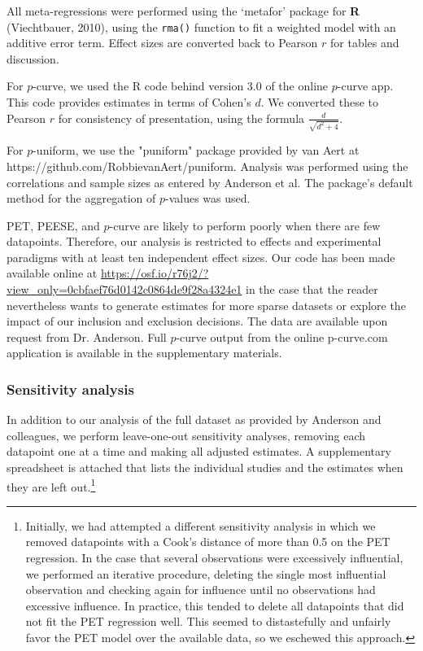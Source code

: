 \documentclass[man, mask]{apa6}
\begin{document}
All meta-regressions were performed using the `metafor' package for {\bf R} (Viechtbauer, 2010), using the {\tt rma()} function to fit a weighted model with an additive error term. Effect sizes are converted back to Pearson $r$ for tables and discussion. 
\nocite{Viechtbauer:2010} 

For $p$-curve, we used the R code behind version 3.0 of the online $p$-curve app. This code provides estimates in terms of Cohen's $d$. We converted these to Pearson $r$ for consistency of presentation, using the formula $\frac{d}{\sqrt{d^2+4}}$.

For $p$-uniform, we use the "puniform" package provided by van Aert at https://github.com/RobbievanAert/puniform. Analysis was performed using the correlations and sample sizes as entered by Anderson et al. The package's default method for the aggregation of $p$-values was used.


PET, PEESE, and $p$-curve are likely to perform poorly when there are few datapoints. Therefore, our analysis is restricted to effects and experimental paradigms with at least ten independent effect sizes. %
Our code has been made available online at \url{https://osf.io/r76j2/?view\_only=0cbfaef76d0142c0864de9f28a4324e1} in the case that the reader nevertheless wants to generate estimates for more sparse datasets or explore the impact of our inclusion and exclusion decisions. The data are available upon request from Dr. Anderson. Full $p$-curve output from the online p-curve.com application is available in the supplementary materials.%

\subsubsection{Sensitivity analysis}
In addition to our analysis of the full dataset as provided by Anderson and colleagues, we perform leave-one-out sensitivity analyses, removing each datapoint one at a time and making all adjusted estimates. A supplementary spreadsheet is attached that lists the individual studies and the estimates when they are left out.\footnote{Initially, we had attempted a different sensitivity analysis in which we removed datapoints with a Cook's distance of more than 0.5 on the PET regression. In the case that several observations were excessively influential, we performed an iterative procedure, deleting the single most influential observation and checking again for influence until no observations had excessive influence. In practice, this tended to delete all datapoints that did not fit the PET regression well. This seemed to distastefully and unfairly favor the PET model over the available data, so we eschewed this approach.} %
\end{document}
